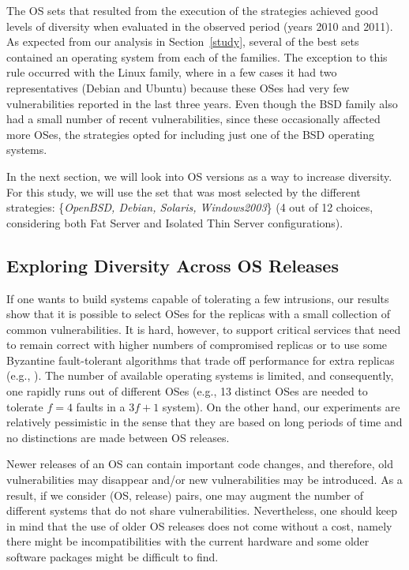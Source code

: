 The OS sets that resulted from the execution of the strategies achieved good levels of diversity when evaluated in the observed period (years 2010 and 2011). As expected from our analysis in Section~\ref{study}, several of the best sets contained an operating system from each of the families. The exception to this rule occurred with the Linux family, where in a few cases it had two representatives (Debian and Ubuntu) because these OSes had very few vulnerabilities reported in the last three years. Even though the BSD family also had a small number of recent vulnerabilities, since these occasionally affected more OSes, the strategies opted for including just one of the BSD operating systems.

In the next section, we will look into OS versions as a way to increase diversity. For this study, we will use the set that was most selected by the different strategies: \{\emph{OpenBSD, Debian, Solaris, Windows2003}\} (4 out of 12 choices, considering both Fat Server and Isolated Thin Server configurations).


\subsection*{Exploring Diversity Across OS Releases}
\label{releases}

If one wants to build systems capable of tolerating a few intrusions, our results show that it is possible to select OSes for the replicas with a small collection of common vulnerabilities. It is hard, however, to support critical services that need to remain correct with higher numbers of compromised replicas or to use some Byzantine fault-tolerant algorithms that trade off performance for extra replicas (e.g., \cite{Abd05,Kot09,Ser10}). The number of available operating systems is limited, and consequently, one rapidly runs out of different OSes (e.g., 13 distinct OSes are needed to tolerate $f=4$ faults in a $3f+1$ system). On the other hand, our experiments are relatively pessimistic in the sense that they are based on long periods of time and no distinctions are made between OS releases.

Newer releases of an OS can contain important code changes, and therefore, old vulnerabilities may disappear and/or new vulnerabilities may be introduced. As a result, if we consider (OS, release) pairs, one may augment the number of different systems that do not share vulnerabilities. Nevertheless, one should keep in mind that the use of older OS releases does not come without a cost, namely there might be incompatibilities with the current hardware and some older software packages might be difficult to find.

